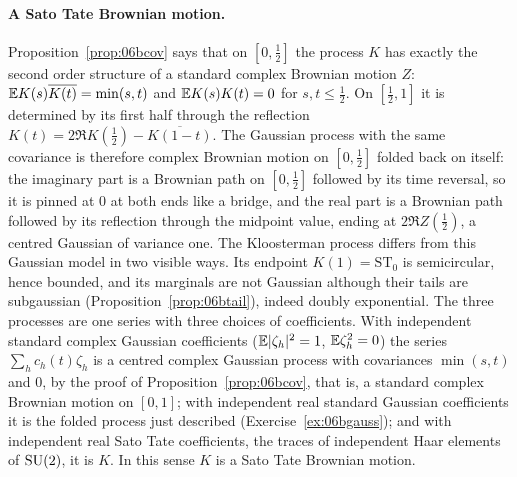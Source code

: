 \paragraph{A Sato Tate Brownian motion.} Proposition~\ref{prop:06bcov} says that on $[0,\frac12]$ the process $K$ has exactly the second order structure of a standard complex Brownian motion $Z$: $\mathbb{E} K(s)\overline{K(t)}=\min(s,t)$ and $\mathbb{E} K(s)K(t)=0$ for $s,t\le\frac12$. On $[\frac12,1]$ it is determined by its first half through the reflection $K(t)=2\Re K(\frac12)-\overline{K(1-t)}$. The Gaussian process with the same covariance is therefore complex Brownian motion on $[0,\frac12]$ folded back on itself: the imaginary part is a Brownian path on $[0,\frac12]$ followed by its time reversal, so it is pinned at $0$ at both ends like a bridge, and the real part is a Brownian path followed by its reflection through the midpoint value, ending at $2\Re Z(\frac12)$, a centred Gaussian of variance one. The Kloosterman process differs from this Gaussian model in two visible ways. Its endpoint $K(1)=\mathrm{ST}_0$ is semicircular, hence bounded, and its marginals are not Gaussian although their tails are subgaussian (Proposition~\ref{prop:06btail}), indeed doubly exponential. The three processes are one series with three choices of coefficients. With independent standard complex Gaussian coefficients ($\mathbb{E}|\zeta_h|^2=1$, $\mathbb{E}\zeta_h^2=0$) the series $\sum_hc_h(t)\zeta_h$ is a centred complex Gaussian process with covariances $\min(s,t)$ and $0$, by the proof of Proposition~\ref{prop:06bcov}, that is, a standard complex Brownian motion on $[0,1]$; with independent real standard Gaussian coefficients it is the folded process just described (Exercise~\ref{ex:06bgauss}); and with independent real Sato Tate coefficients, the traces of independent Haar elements of $\mathrm{SU}(2)$, it is $K$. In this sense $K$ is a Sato Tate Brownian motion.

